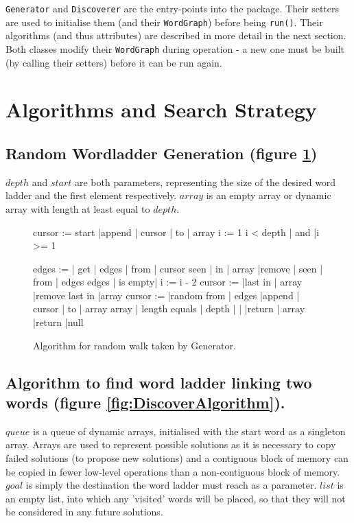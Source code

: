 \documentclass[11pt]{article} %
\begin{document}
\texttt{Generator} and \texttt{Discoverer} are the entry-points into the package. Their setters are used to initialise them (and their \texttt{WordGraph}) before being \texttt{run()}. Their algorithms (and thus attributes) are described in more detail in the next section. Both classes modify their \texttt{WordGraph} during operation - a new one must be built (by calling their setters) before it can be run again.

\section{Algorithms and Search Strategy}

\subsection{Random Wordladder Generation (figure \ref{fig:GeneratorAlgorithm}) } 
$depth$ and $start$ are both parameters, representing the size of the desired word ladder and the first element respectively. $array$ is an empty array or dynamic array with length at least equal to $depth$.

\begin{figure}[h!!]
\caption{Algorithm for random walk taken by Generator.}
\begin{program}
\BEGIN
cursor := start
|append | cursor | to | array
i := 1
\WHILE i < depth | and |i >= 1 \DO

	edges := | get | edges | from | cursor 
	\FOR seen | in | array \DO
		|remove | seen | from | edges  
	\OD
	\IF edges | is empty| \THEN 
		i := i - 2 
		cursor := |last in | array
		|remove last in |array
	\ELSE
		cursor := |random from | edges 
		|append | cursor | to | array 
	\FI
\OD
\IF array | length equals | depth | |\THEN
	|return | array 
\ELSE
	|return |null 
\FI
	
\END	
\end{program}

\label{fig:GeneratorAlgorithm}
\end{figure}

\subsection{Algorithm to find word ladder linking two words (figure \ref{fig:DiscoverAlgorithm}).}
$queue$ is a queue of dynamic arrays, initialised with the start word as a singleton array. Arrays are used to represent possible solutions as it is necessary to copy failed solutions (to propose new solutions) and a contiguous block of memory can be copied in fewer low-level operations than a non-contiguous block of memory. $goal$ is simply the destination the word ladder must reach as a parameter. $list$ is an empty list, into which any 'visited' words will be placed, so that they will not be considered in any future solutions.
\end{document}

